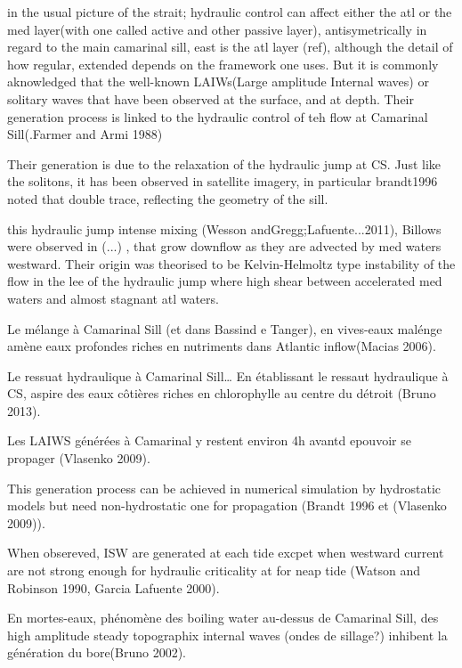 in the usual picture of the strait; hydraulic control can affect either the atl or the med layer(with one called active and other passive layer), antisymetrically in regard to the main camarinal sill, east is the atl layer (ref), although the detail of how regular, extended depends on the framework one uses. But it is commonly aknowledged that the well-known LAIWs(Large amplitude Internal waves) or solitary waves that have been observed at the surface, and at depth. Their generation process is linked to the hydraulic control of teh flow at Camarinal Sill(.Farmer and Armi 1988)

Their generation is due to the relaxation of the hydraulic jump at CS. Just like the solitons, it has been observed in satellite imagery, in particular brandt1996 noted that double trace, reflecting the geometry of the sill.

this hydraulic jump  intense mixing (Wesson andGregg;Lafuente...2011),
Billows were observed in (...) , that grow downflow as they are advected by med waters westward. Their origin was theorised to be Kelvin-Helmoltz type instability of the flow in the lee of the hydraulic jump where high shear between accelerated med waters and almost stagnant atl waters.

Le mélange à Camarinal Sill (et dans Bassind e Tanger), en vives-eaux malénge amène eaux profondes riches en nutriments dans Atlantic inflow(Macias 2006).

Le ressuat hydraulique à Camarinal Sill… En établissant le ressaut hydraulique à CS, aspire des eaux côtières riches en chlorophylle au centre du détroit (Bruno 2013).

Les LAIWS générées à Camarinal y restent environ 4h avantd epouvoir se propager (Vlasenko 2009).

This generation process can be achieved in numerical simulation by hydrostatic models but need non-hydrostatic one for propagation (Brandt 1996 et (Vlasenko 2009)).

When obsereved, ISW are generated at each tide excpet when westward current are not strong enough for hydraulic criticality at for neap tide (Watson and Robinson 1990, Garcia Lafuente 2000). 

En mortes-eaux, phénomène des boiling water au-dessus de Camarinal Sill, des high amplitude steady topographix internal waves (ondes de sillage?) inhibent la génération du bore(Bruno 2002).



